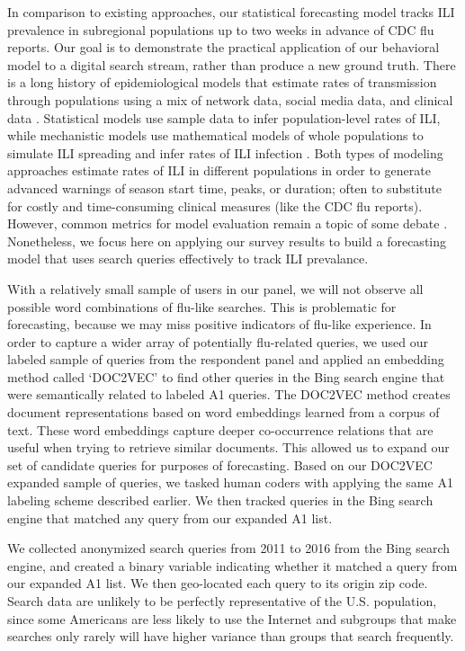\documentclass[fleqn,10pt]{wlscirep}
\begin{document}
In comparison to existing approaches, our statistical forecasting model tracks ILI prevalence in subregional populations up to two weeks in advance of CDC flu reports. Our goal is to demonstrate the practical application of our behavioral model to a digital search stream, rather than produce a new ground truth. There is a long history of epidemiological models that estimate rates of transmission through populations using a mix of network data, social media data, and clinical data \cite{ginsberg_etal_2009,culotta2010towards,bodnar2013validating,nsoesie2014guess,generous2014global,yang_etal_2015inference,yang_etal_2015,biggerstaff_etal_2016,zhang2017forecasting}. Statistical models use sample data to infer population-level rates of ILI, while mechanistic models use mathematical models of whole populations to simulate ILI spreading and infer rates of ILI infection \cite{biggerstaff_etal_2016}. Both types of modeling approaches estimate rates of ILI in different populations in order to generate advanced warnings of season start time, peaks, or duration; often to substitute for costly and time-consuming clinical measures (like the CDC flu reports). However, common metrics for model evaluation remain a topic of some debate \cite{biggerstaff_etal_2016}. Nonetheless, we focus here on applying our survey results to build a forecasting model that uses search queries effectively to track ILI prevalance. 

With a relatively small sample of users in our panel, we will not observe all possible word combinations of flu-like searches. This is problematic for forecasting, because we may miss positive indicators of flu-like experience. In order to capture a wider array of potentially flu-related queries, we used our labeled sample of queries from the respondent panel and applied an embedding method called `DOC2VEC' \cite{le_and_mikolov_2014} to find other queries in the Bing search engine that were semantically related to labeled A1 queries. The DOC2VEC method creates document representations based on word embeddings learned from a corpus of text. These word embeddings capture deeper co-occurrence relations that are useful when trying to retrieve similar documents. This allowed us to expand our set of candidate queries for purposes of forecasting. Based on our DOC2VEC expanded sample of queries, we tasked human coders with applying the same A1 labeling scheme described earlier. We then tracked queries in the Bing search engine that matched any query from our expanded A1 list.

We collected anonymized search queries from 2011 to 2016 from the Bing search engine, and created a binary variable indicating whether it matched a query from our expanded A1 list. We then geo-located each query to its origin zip code. Search data are unlikely to be perfectly representative of the U.S. population, since some Americans are less likely to use the Internet and subgroups that make searches only rarely will have higher variance than groups that search frequently. 
\end{document}
